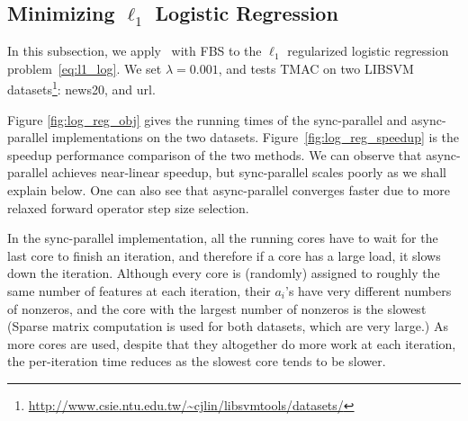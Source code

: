 \subsection{Minimizing $\ell_1$ Logistic Regression}
In this subsection, we apply \pkg~with FBS to the $\ell_1$ regularized logistic regression problem~\eqref{eq:l1_log}. We set $\lambda =0.001$, and tests TMAC on two LIBSVM datasets\footnote{\url{http://www.csie.ntu.edu.tw/~cjlin/libsvmtools/datasets/}}: news20, and url.

Figure \ref{fig:log_reg_obj} gives the running times of  the sync-parallel and async-parallel implementations on the two datasets. Figure~\ref{fig:log_reg_speedup} is the speedup performance comparison of the two methods. We can observe that async-parallel achieves near-linear speedup, but sync-parallel scales poorly as we shall explain below. One can also see that async-parallel converges faster due to more relaxed forward operator step size selection.

In the sync-parallel implementation,  all the running cores have to wait for the last core to finish an iteration, and therefore if a core has a large load, it slows down the iteration. Although every core is (randomly) assigned to roughly the same number of features at each iteration, their  $a_i$'s have very different numbers of nonzeros, and the core with the largest number of nonzeros is the slowest (Sparse matrix computation is used for both datasets, which are very large.) As more cores are used,  despite that they altogether do more work at each iteration, the per-iteration time reduces as the slowest core tends to be slower.


